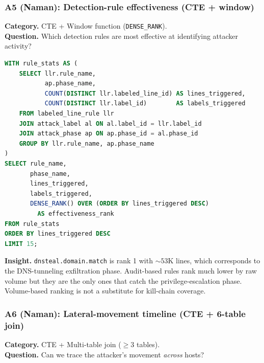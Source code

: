 \subsubsection{A5 (Naman): Detection-rule effectiveness (CTE + window)}
\textbf{Category.} CTE + Window function (\texttt{DENSE\_RANK}).\\
\textbf{Question.} Which detection rules are most effective at
identifying attacker activity?

\begin{lstlisting}[language=SQL]
WITH rule_stats AS (
    SELECT llr.rule_name,
           ap.phase_name,
           COUNT(DISTINCT llr.labeled_line_id) AS lines_triggered,
           COUNT(DISTINCT llr.label_id)        AS labels_triggered
    FROM labeled_line_rule llr
    JOIN attack_label al ON al.label_id = llr.label_id
    JOIN attack_phase ap ON ap.phase_id = al.phase_id
    GROUP BY llr.rule_name, ap.phase_name
)
SELECT rule_name,
       phase_name,
       lines_triggered,
       labels_triggered,
       DENSE_RANK() OVER (ORDER BY lines_triggered DESC)
         AS effectiveness_rank
FROM rule_stats
ORDER BY lines_triggered DESC
LIMIT 15;
\end{lstlisting}
\textbf{Insight.} \texttt{dnsteal.domain.match} is rank 1 with $\sim 53$K
lines, which corresponds to the DNS-tunneling exfiltration phase.
Audit-based rules rank much lower by raw volume but they are the only
ones that catch the privilege-escalation phase. Volume-based ranking is
not a substitute for kill-chain coverage.

\subsubsection{A6 (Naman): Lateral-movement timeline (CTE + 6-table join)}
\textbf{Category.} CTE + Multi-table join ($\geq 3$ tables).\\
\textbf{Question.} Can we trace the attacker's movement \emph{across}
hosts?

